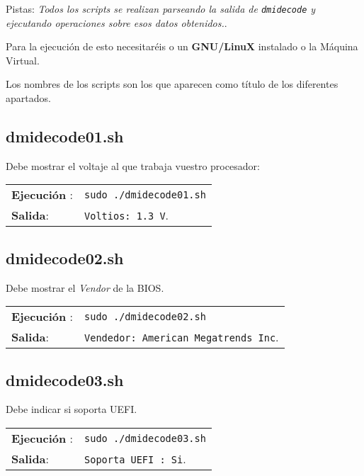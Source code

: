 \documentclass[11pt]{article}
\begin{document}
Pistas: \emph{Todos los scripts se realizan parseando la salida de \texttt{dmidecode} y}
\emph{ejecutando operaciones sobre esos datos obtenidos.}.

Para la ejecución de esto necesitaréis o un \textbf{\textbf{GNU/LinuX}} instalado o la
Máquina Virtual.

Los nombres de los scripts son los que aparecen como título de los diferentes apartados.

\subsection{dmidecode01.sh}
\label{sec:orgf17f3ef}

Debe mostrar el voltaje al que trabaja vuestro procesador:

\begin{center}
\begin{tabular}{ll}
\textbf{\textbf{Ejecución}} : & \texttt{sudo ./dmidecode01.sh}\\
\textbf{\textbf{Salida}}: & \texttt{Voltios: 1.3 V}.\\
\end{tabular}
\end{center}

\subsection{dmidecode02.sh}
\label{sec:org5a55dbf}

Debe mostrar el \emph{Vendor} de la BIOS.

\begin{center}
\begin{tabular}{ll}
\textbf{\textbf{Ejecución}} : & \texttt{sudo ./dmidecode02.sh}\\
\textbf{\textbf{Salida}}: & \texttt{Vendedor: American Megatrends Inc}.\\
\end{tabular}
\end{center}

\subsection{dmidecode03.sh}
\label{sec:org8d85d88}

Debe indicar si soporta UEFI.

\begin{center}
\begin{tabular}{ll}
\textbf{\textbf{Ejecución}} : & \texttt{sudo ./dmidecode03.sh}\\
\textbf{\textbf{Salida}}: & \texttt{Soporta UEFI : Si}.\\
\end{tabular}
\end{center}
\end{document}
